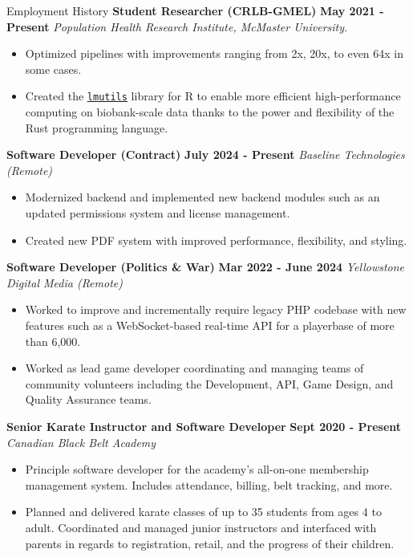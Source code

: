 \newcommand{\employer}[5]{%
\entry*
	\textbf{#1} \hfill \textbf{#2 - #3}
	\newline
	\textit{#4}
	\begin{itemize}
	\setlength\parskip{-4pt}
	\vspace{-5pt}
		#5
	\end{itemize}
}

\newcommand{\link}[1]{\textcolor{MarkerColor}{\underline{#1}}}


\begin{rubric}{Employment History}
\employer{Student Researcher (CRLB-GMEL)}{May 2021}{Present}{Population Health Research Institute, McMaster University.}{
	\item Optimized pipelines with improvements ranging from 2x, 20x, to even 64x in some cases.
	\item Created the \href{https://github.com/GMELab/lmutils.r}{\link{\texttt{lmutils}}} library for R to enable more efficient high-performance computing on biobank-scale data thanks to the power and flexibility of the Rust programming language.
}
\employer{Software Developer (Contract)}{July 2024}{Present}{Baseline Technologies (Remote)}{
	\item Modernized backend and implemented new backend modules such as an updated permissions system and license management.
	\item Created new PDF system with improved performance, flexibility, and styling.
}
\employer{Software Developer (Politics \& War)}{Mar 2022}{June 2024}{Yellowstone Digital Media (Remote)}{
	\item Worked to improve and incrementally require legacy PHP codebase with new features such as a WebSocket-based real-time API for a playerbase of more than 6,000.
	\item Worked as lead game developer coordinating and managing teams of community volunteers including the Development, API, Game Design, and Quality Assurance teams.
}
\employer{Senior Karate Instructor and Software Developer}{Sept 2020}{Present}{Canadian Black Belt Academy}{
	\item Principle software developer for the academy's all-on-one membership management system. Includes attendance, billing, belt tracking, and more.
	\item Planned and delivered karate classes of up to 35 students from ages 4 to adult. Coordinated and managed junior instructors and interfaced with parents in regards to registration, retail, and the progress of their children.
}
\end{rubric}
